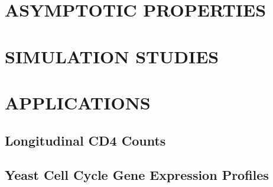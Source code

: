\documentclass[11pt]{report}
\begin{document}
\section{ASYMPTOTIC PROPERTIES}

\section{SIMULATION STUDIES}

\section{APPLICATIONS}

\subsection*{Longitudinal CD4 Counts}

\subsection*{Yeast Cell Cycle Gene Expression Profiles}
\end{document}
